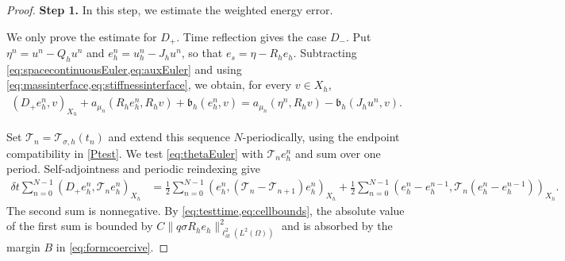 \documentclass[print,wide,eng]{draft}
\begin{document}
\begin{proof}
{\bf Step 1.} In this step, we estimate the weighted energy error.

We only prove the estimate for $D_+$. Time reflection gives the case $D_-$. Put $\eta^n=u^n-Q_hu^n$ and $e_h^n=u_h^n-J_hu^n$, so that $e_s=\eta-R_he_h$. Subtracting \cref{eq:spacecontinuousEuler,eq:auxEuler} and using \cref{eq:massinterface,eq:stiffnessinterface}, we obtain, for every $v\in X_h$,\vspace{-2mm}
%
\begin{align}\label{eq:thetaEuler}
(D_+e_h^n,v)_{X_h}+a_{\mu_n}(R_he_h^n,R_hv)+\mathfrak b_h(e_h^n,v)
=a_{\mu_n}(\eta^n,R_hv)-\mathfrak b_h(J_hu^n,v).
\end{align}
%

Set $\mathscr{T}_n=\mathscr{T}_{\sigma,h}(t_n)$ and extend this sequence $N$-periodically, using the endpoint compatibility in \cref{Ptest}.
We test \cref{eq:thetaEuler} with $\mathscr{T}_ne_h^n$ and sum over one period. Self-adjointness and periodic reindexing give\vspace{-2mm}
%
\begin{align}\label{eq:weighted-time-summation}
{\delta t}\sum_{n=0}^{N-1}(D_+e_h^n,\mathscr{T}_ne_h^n)_{X_h}
&=\frac{1}{2}\sum_{n=0}^{N-1}(e_h^n,(\mathscr{T}_n-\mathscr{T}_{n+1})e_h^n)_{X_h}
+\frac{1}{2}\sum_{n=0}^{N-1}(e_h^n-e_h^{n-1},\mathscr{T}_n(e_h^n-e_h^{n-1}))_{X_h}.
\end{align}
%
The second sum is nonnegative. By \cref{eq:testtime,eq:cellbounds}, the absolute value of the first sum is bounded by $C\|q\sigma R_he_h\|_{\ell_{\delta t}^2(L^2(\Omega))}^2$ and is absorbed by the margin $B$ in \cref{eq:formcoercive}.


\end{proof}
\end{document}
